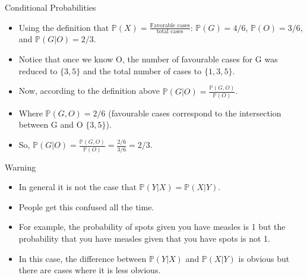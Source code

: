\documentclass[handout]{beamer}
\begin{document}
\begin{frame}{Conditional Probabilities}
\scriptsize{

\begin{itemize}
 \item Using the definition that $\mathbb{P}(X)=\frac{\text{Favorable cases}}{\text{total cases}}$: $\mathbb{P}(G)=4/6$, $\mathbb{P}(O)=3/6$, and $\mathbb{P}(G|O)= 2/3.$
 
 \item Notice that once we know O, the number of favourable cases for G was reduced to $\{3,5\}$ and the total number of cases to $\{1,3,5\}$.
 
 
 \item Now, according to the definition above $\mathbb{P}(G|O) = \frac{\mathbb{P}(G,O)}{\mathbb{P}(O)}$.
 
 \item Where $\mathbb{P}(G,O) = 2/6$ (favourable cases correspond to the intersection between G and O $\{3,5\}$).

 \item So, $\mathbb{P}(G|O) = \frac{\mathbb{P}(G,O)}{\mathbb{P}(O)}=\frac{2/6}{3/6}=2/3$.
 

\end{itemize}

\begin{block}{Warning}
\begin{itemize}
 \item In general it is not the case that $\mathbb{P}(Y|X) = \mathbb{P}(X|Y)$. 
\item People get this confused all the time. 
\item For example, the probability of spots given you have measles is 1 but the probability that you have measles given that you have spots is not 1. 
\item In this case, the difference between $\mathbb{P}(Y|X)$ and $\mathbb{P}(X|Y)$ is obvious but there are cases where it is less obvious.
\end{itemize}
 
\end{block}



} 
\end{frame}
\end{document}
